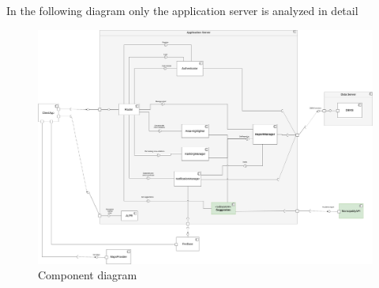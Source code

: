 \documentclass{article}
\begin{document}
In the following diagram only the application server is analyzed in detail

\begin{figure}[ht]
\centering
	\includegraphics[width=1.0\textwidth]{images/components-diagram.png}
	\caption{Component diagram}
	\label{fig:component-diagram}
\end{figure}
\end{document}
